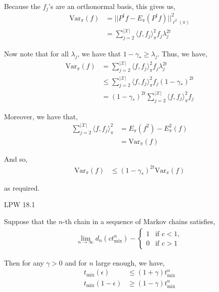 \documentclass[12pt]{article}
\newenvironment{problem}[2][Problem]{\begin{trivlist}
\item[\hskip \labelsep {\bfseries #1}\hskip \labelsep {\bfseries #2.}]}{\end{trivlist}}
\begin{document}
Because the $f_j$'s are an orthonormal basis, this gives us,
\begin{align*}
\text{Var}_{\pi}(f) &= ||P^t f - E_{\pi}(P^tf)||^2_{\ell^2(\pi)}\\
&= \sum_{j=2}^{| \mathcal{X} |} \langle f, f_j \rangle_{\pi}^2 f_j \lambda_j^{2t}
\end{align*}

Now note that for all $\lambda_j$, we have that $1 - \gamma_* \geq \lambda_j$. Thus, we have,
\begin{align*}
\text{Var}_{\pi}(f) &= \sum_{j=2}^{| \mathcal{X} |} \langle f, f_j \rangle_{\pi}^2 f_j \lambda_j^{2t}\\
&\leq \sum_{j=2}^{| \mathcal{X} |} \langle f, f_j \rangle_{\pi}^2 f_j (1 - \gamma_*)^{2t}\\
&= (1 - \gamma_*)^{2t} \sum_{j=2}^{| \mathcal{X} |} \langle f, f_j \rangle_{\pi}^2 f_j
\end{align*} 

Moreover, we have that,
\begin{align*}
\sum_{j=2}^{| \mathcal{X} |} \langle f, f_j \rangle_{\pi}^2 &= E_{\pi}(f^2) - E^2_{\pi}(f)\\
&= \text{Var}_{\pi}(f)
\end{align*}

And so,
\begin{align*}
\text{Var}_{\pi}(f) &\leq (1 - \gamma_*)^{2t} \text{Var}_{\pi}(f)
\end{align*}

as required.

\newpage
\begin{problem}{III}
LPW 18.1
\end{problem}

Suppose that the $n$-th chain in a sequence of Markov chains satisfies,
\begin{align*}
\lim_{n \to \infty} d_n (c t^n_{\text{mix}}) - \begin{cases}
1 & \text{if } c < 1,\\
0 & \text{if } c > 1
\end{cases}
\end{align*}

Then for any $\gamma > 0$ and for $n$ large enough, we have,
\begin{align*}
t_{\text{mix}}(\epsilon) &\leq (1 + \gamma) t^n_{\text{mix}}\\
t_{\text{mix}}(1 - \epsilon) &\geq (1 - \gamma)t^n_{\text{mix}}
\end{align*}
\end{document}
